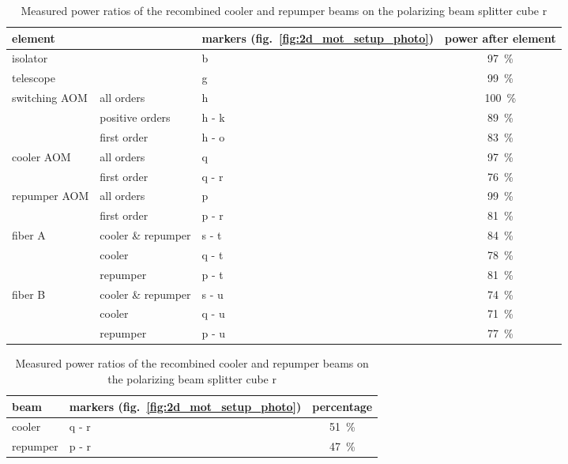 \begin{table}
    \centering
    \begin{subtable}{\textwidth}
        \centering
        \begin{tabular}{lllc}
            \toprule
            \multicolumn{2}{l}{\textbf{element}} & \textbf{markers} (fig.~\ref{fig:2d_mot_setup_photo}) & \textbf{power after element} \\
            \toprule
            isolator & & b & \SI{97}{\percent} \\
            \midrule
            telescope & & g & \SI{99}{\percent} \\
            \midrule
            \multirow{3}{*}{switching AOM} & all orders & h & \SI{100}{\percent} \\ 
            & positive orders & h - k & \SI{89}{\percent} \\
            & first order & h - o & \SI{83}{\percent} \\
            \midrule
            \multirow{2}{*}{cooler AOM} & all orders & q & \SI{97}{\percent} \\
            & first order  & q - r & \SI{76}{\percent} \\
            \midrule
            \multirow{2}{*}{repumper AOM} & all orders & p & \SI{99}{\percent} \\
            & first order  & p - r & \SI{81}{\percent} \\
            \midrule
            \multirow{3}{*}{fiber A} & cooler \& repumper & s - t & \SI{84}{\percent} \\
            & cooler & q - t & \SI{78}{\percent} \\
            & repumper & p - t & \SI{81}{\percent} \\
            \midrule
            \multirow{3}{*}{fiber B} & cooler \& repumper & s - u & \SI{74}{\percent} \\
            & cooler & q - u & \SI{71}{\percent} \\
            & repumper & p - u & \SI{77}{\percent} \\
            \bottomrule
        \end{tabular}
        \caption{Measured remaining powers after dissipating elements}
        \label{tab:power_loss_table}
    \end{subtable}

    \vspace{0.6cm}
    \begin{subtable}{0.5\textwidth}
        \centering
        \begin{tabular}{llc}
            \toprule
            \textbf{beam} & \textbf{markers} (fig.~\ref{fig:2d_mot_setup_photo}) & \textbf{percentage} \\
            \toprule
            cooler & q - r & \SI{51}{\percent} \\
            repumper & p - r & \SI{47}{\percent} \\
            \bottomrule
        \end{tabular}
        \caption{Measured power ratios of the recombined cooler and repumper beams on the polarizing beam splitter cube r}
        \label{tab:power_recombination}
    \end{subtable}


\end{table}
